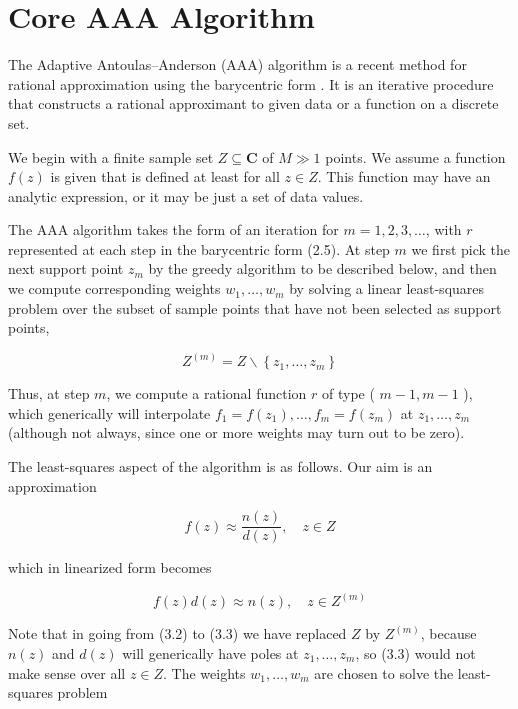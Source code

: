 \documentclass[11pt]{article}
\theoremstyle{definition}
\begin{document}
    \section{Core AAA Algorithm} 
    The Adaptive Antoulas–Anderson (AAA) algorithm is a recent method for rational approximation
using the barycentric form \cite{AAAalg}. It is an iterative procedure that constructs a rational approximant to given
data or a function on a discrete set.

    We begin with a finite sample set $Z \subseteq \mathbf{C}$ of $M \gg 1$ points. We assume a function $f(z)$ is given that is defined at least for all $z \in Z$. This function may have an analytic expression, or it may be just a set of data values.
    
    The AAA algorithm takes the form of an iteration for $m=1,2,3, \ldots$, with $r$ represented at each step in the barycentric form (2.5). At step $m$ we first pick the next support point $z_{m}$ by the greedy algorithm to be described below, and then we compute corresponding weights $w_{1}, \ldots, w_{m}$ by solving a linear least-squares problem over the subset of sample points that have not been selected as support points,
    
    
    \begin{equation*}
    Z^{(m)}=Z \backslash\left\{z_{1}, \ldots, z_{m}\right\} \tag{3.1}
    \end{equation*}
    
    
    Thus, at step $m$, we compute a rational function $r$ of type ( $m-1, m-1$ ), which generically will interpolate $f_{1}=f\left(z_{1}\right), \ldots, f_{m}=f\left(z_{m}\right)$ at $z_{1}, \ldots, z_{m}$ (although not always, since one or more weights may turn out to be zero).
    
    The least-squares aspect of the algorithm is as follows. Our aim is an approximation
    
    
    \begin{equation*}
    f(z) \approx \frac{n(z)}{d(z)}, \quad z \in Z \tag{3.2}
    \end{equation*}
    
    
    which in linearized form becomes
    
    
    \begin{equation*}
    f(z) d(z) \approx n(z), \quad z \in Z^{(m)} \tag{3.3}
    \end{equation*}
    
    
    Note that in going from (3.2) to (3.3) we have replaced $Z$ by $Z^{(m)}$, because $n(z)$ and $d(z)$ will generically have poles at $z_{1}, \ldots, z_{m}$, so (3.3) would not make sense over all $z \in Z$. The weights $w_{1}, \ldots, w_{m}$ are chosen to solve the least-squares problem
    
\end{document}
